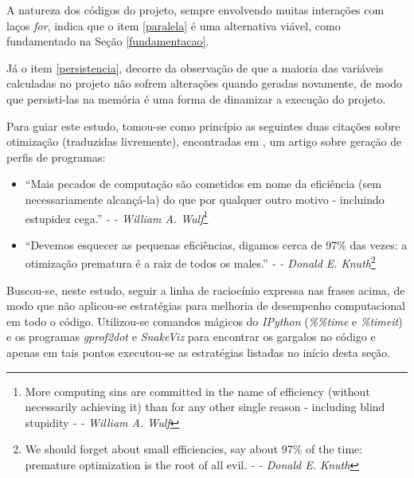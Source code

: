 \documentclass[12pt]{article}
\newcommand{\aspas}[1]{``#1''} %
\begin{document}
A natureza dos códigos do projeto, sempre envolvendo muitas interações com laços \textit{for}, indica que o item \ref{paralela} é uma alternativa viável, como fundamentado na Seção \ref{fundamentacao}.

Já o item \ref{persistencia}, decorre da observação de que a maioria das variáveis calculadas no projeto não sofrem alterações quando geradas novamente, de modo que persisti-las na memória é uma forma de dinamizar a execução do projeto.

Para guiar este estudo, tomou-se como princípio as seguintes duas citações sobre otimização (traduzidas livremente), encontradas em \cite{hegde:2004}, um artigo sobre geração de perfis de programas:

\begin{itemize}
	\item \aspas{Mais pecados de computação são cometidos em nome da eficiência (sem necessariamente alcançá-la) do que por qualquer outro motivo - incluindo estupidez cega.} \textit{- -  William A. Wulf}\footnote{More computing sins are committed in the name of efficiency (without necessarily achieving it) than for any other single reason - including blind stupidity \textit{- -  William A. Wulf}}
	\item \aspas{Devemos esquecer as pequenas eficiências, digamos cerca de 97\% das vezes: a otimização prematura é a raiz de todos os males.} \textit{- -  Donald E. Knuth}\footnote{We should forget about small efficiencies, say about 97\% of the time: premature optimization is the root of all evil. \textit{- -  Donald E. Knuth}}
\end{itemize}

Buscou-se, neste estudo, seguir a linha de raciocínio expressa nas frases acima, de modo que não aplicou-se estratégias para melhoria de desempenho computacional em todo o código. Utilizou-se comandos mágicos do \textit{IPython} (\textit{\%\%time} e \textit{\%timeit}) e os programas \textit{gprof2dot} e \textit{SnakeViz} para encontrar os gargalos no código e apenas em tais pontos executou-se as estratégias listadas no início desta seção.


\end{document}

